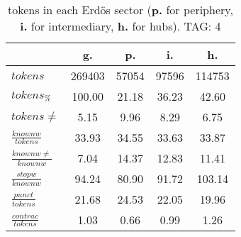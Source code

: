 \begin{table}[h!]
\begin{center}
\begin{tabular}{| l | c | c | c | c |}\hline
 & g. & p. & i. & h. \\\hline
$tokens$ & 269403  & 57054  & 97596  & 114753 \\\hline
$tokens_{\%}$ & 100.00  & 21.18  & 36.23  & 42.60 \\\hline
$tokens \neq$ & 5.15  & 9.96  & 8.29  & 6.75 \\\hline
$\frac{knownw}{tokens}$ & 33.93  & 34.55  & 33.63  & 33.87 \\\hline
$\frac{knownw \neq}{knownw}$ & 7.04  & 14.37  & 12.83  & 11.41 \\\hline
$\frac{stopw}{knownw}$ & 94.24  & 80.90  & 91.72  & 103.14 \\\hline
$\frac{punct}{tokens}$ & 21.68  & 24.53  & 22.05  & 19.96 \\\hline
$\frac{contrac}{tokens}$ & 1.03  & 0.66  & 0.99  & 1.26 \\\hline
\end{tabular}
\caption{tokens in each Erd\"os sector ({{\bf p.}} for periphery, {{\bf i.}} for intermediary, 
    {{\bf h.}} for hubs). TAG: 4}
\end{center}
\end{table}